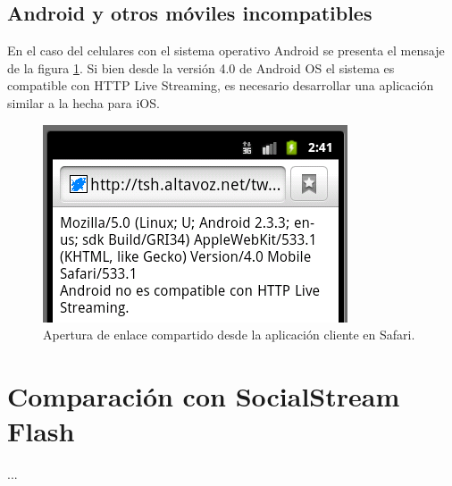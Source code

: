   \subsection{Android y otros móviles incompatibles}
  En el caso del celulares con el sistema operativo Android se presenta el mensaje de la figura \ref{fig:uagent-android}. Si bien desde la versión 4.0 de Android OS el sistema es compatible con HTTP Live Streaming, es necesario desarrollar una aplicación similar a la hecha para iOS.
    \begin{figure}[H]
	\centering
	\includegraphics[scale=0.7]{imgs/uagent-android.png} 
	\caption{Apertura de enlace compartido desde la aplicación cliente en Safari.}
	\label{fig:uagent-android}
\end{figure}  


\section{Comparación con SocialStream Flash}
...



